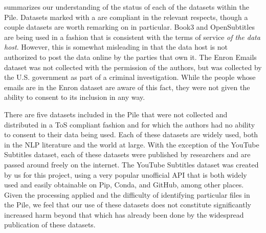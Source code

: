 \documentclass[11pt,a4paper]{article}
\newcommand{\cmark}{\ding{51}}
\begin{document}
 summarizes our understanding of the status of each of the datasets within the Pile. Datasets marked with a \cmark are compliant in the relevant respects, though a couple datasets are worth remarking on in particular. Book3 and OpenSubtitles are being used in a fashion that is consistent with the terms of service \textit{of the data host}. However, this is somewhat misleading in that the data host is not authorized to post the data online by the parties that own it. The Enron Emails dataset was not collected with the permission of the authors, but was collected by the U.S. government as part of a criminal investigation. While the people whose emails are in the Enron dataset are aware of this fact, they were not given the ability to consent to its inclusion in any way.

There are five datasets included in the Pile that were not collected and distributed in a ToS compliant fashion and for which the authors had no ability to consent to their data being used. Each of these datasets are widely used, both in the NLP literature and the world at large. With the exception of the YouTube Subtitles dataset, each of these datasets were published by researchers and are passed around freely on the internet. The YouTube Subtitles dataset was created by us for this project, using a very popular unofficial API that is both widely used and easily obtainable on Pip, Conda, and GitHub, among other places. Given the processing applied and the difficulty of identifying particular files in the Pile, we feel that our use of these datasets does not constitute significantly increased harm beyond that which has already been done by the widespread publication of these datasets.
\end{document}
